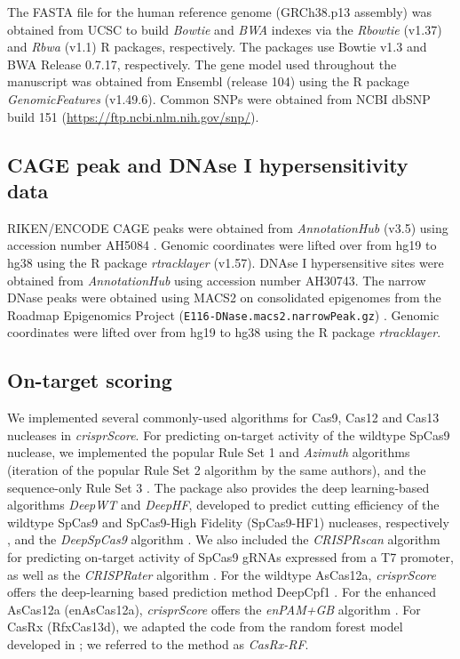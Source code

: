 \documentclass[pdftex,english,10pt]{article}
\begin{document}
The FASTA file for the human reference genome (GRCh38.p13 assembly) was obtained from UCSC to build \textit{Bowtie} and \textit{BWA} indexes via the \textit{Rbowtie} (v1.37) \citep{hahne2012rbowtie} and \textit{Rbwa} (v1.1) R packages, respectively. The packages use Bowtie v1.3 and BWA Release 0.7.17, respectively. 
The gene model used throughout the manuscript was obtained from Ensembl (release 104) using the R package \textit{GenomicFeatures} (v1.49.6).
Common SNPs were obtained from NCBI dbSNP build 151 (\url{https://ftp.ncbi.nlm.nih.gov/snp/}).

\subsection*{CAGE peak and DNAse I hypersensitivity data}

RIKEN/ENCODE CAGE peaks were obtained from \textit{AnnotationHub} (v3.5) using accession number AH5084 \citep{djebali2012landscape}. Genomic coordinates were lifted over from hg19 to hg38 using the R package \textit{rtracklayer} (v1.57). DNAse I hypersensitive sites were obtained from \textit{AnnotationHub} using accession number AH30743. The narrow DNase peaks were obtained using MACS2 on consolidated epigenomes from the Roadmap Epigenomics Project (\texttt{E116-DNase.macs2.narrowPeak.gz}) \citep{kundaje2015integrative}. Genomic coordinates were lifted over from hg19 to hg38 using the R package \textit{rtracklayer}.


\subsection*{On-target scoring}

We implemented several commonly-used algorithms for Cas9, Cas12 and Cas13 nucleases in \textit{crisprScore}.
For predicting on-target activity of the wildtype SpCas9 nuclease, we implemented the popular Rule Set 1 \citep{doench2014rational} and \textit{Azimuth} algorithms \citep{azimuth} (iteration of the popular Rule Set 2 algorithm by the same authors), and the sequence-only Rule Set 3 \citep{ruleset3}. The package also provides the deep learning-based algorithms \textit{DeepWT} and \textit{DeepHF}, developed to predict cutting efficiency of the wildtype SpCas9 and SpCas9-High Fidelity (SpCas9-HF1) nucleases, respectively \citep{deepcas9}, and the \textit{DeepSpCas9} algorithm \citep{deepspcas9}. We also included the \textit{CRISPRscan} algorithm \citep{crisprscan} for predicting on-target activity of SpCas9 gRNAs expressed from a T7 promoter, as well as the \textit{CRISPRater} algorithm \citep{crisprater}. For the wildtype AsCas12a, \textit{crisprScore} offers the deep-learning based prediction method DeepCpf1 \citep{deepcpf1}. For the enhanced AsCas12a (enAsCas12a), \textit{crisprScore} offers the \textit{enPAM+GB} algorithm \citep{enpamgb}. For CasRx (RfxCas13d), we adapted the code from the random forest model developed in \citet{wessels2020massively}; we referred to the method as \textit{CasRx-RF}.
\end{document}

